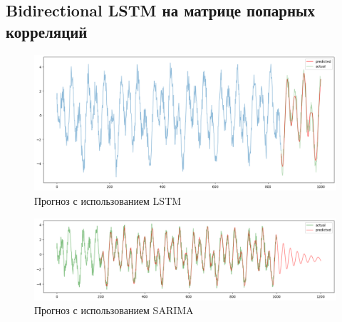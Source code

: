\documentclass{article}
\begin{document}
\subsection{Bidirectional LSTM на матрице попарных корреляций}



\begin{figure}
	\centering
	\includegraphics[width=\textwidth]{LSTM-prediction.png}
	\caption{Прогноз с использованием LSTM}
	\label{fig:fig1}
\end{figure}
\begin{figure}
	\centering
	\includegraphics[width=\textwidth]{SARIMA-prediction.png}
	\caption{Прогноз с использованием SARIMA}
	\label{fig:fig2}
\end{figure}



\end{document}
